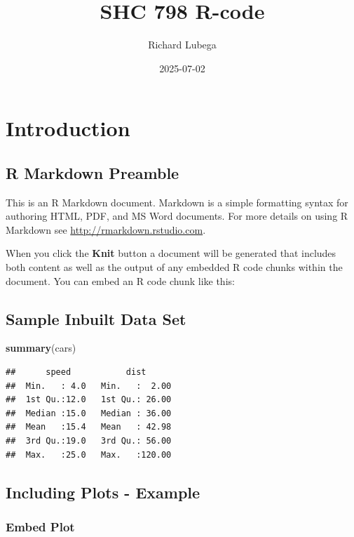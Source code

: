 \documentclass[
]{article}
\title{SHC 798 R-code}
\author{Richard Lubega}
\date{2025-07-02}
\newenvironment{Shaded}{\begin{snugshade}}{\end{snugshade}}
\newcommand{\FunctionTok}[1]{\textcolor[rgb]{0.13,0.29,0.53}{\textbf{#1}}}
\newcommand{\NormalTok}[1]{#1}
\begin{document}
\maketitle

\section{Introduction}\label{introduction}

\subsection{R Markdown Preamble}\label{r-markdown-preamble}

This is an R Markdown document. Markdown is a simple formatting syntax
for authoring HTML, PDF, and MS Word documents. For more details on
using R Markdown see \url{http://rmarkdown.rstudio.com}.

When you click the \textbf{Knit} button a document will be generated
that includes both content as well as the output of any embedded R code
chunks within the document. You can embed an R code chunk like this:

\subsection{Sample Inbuilt Data Set}\label{sample-inbuilt-data-set}

\begin{Shaded}
\begin{Highlighting}[]
\FunctionTok{summary}\NormalTok{(cars)}
\end{Highlighting}
\end{Shaded}

\begin{verbatim}
##      speed           dist       
##  Min.   : 4.0   Min.   :  2.00  
##  1st Qu.:12.0   1st Qu.: 26.00  
##  Median :15.0   Median : 36.00  
##  Mean   :15.4   Mean   : 42.98  
##  3rd Qu.:19.0   3rd Qu.: 56.00  
##  Max.   :25.0   Max.   :120.00
\end{verbatim}

\subsection{Including Plots - Example}\label{including-plots---example}

\subsubsection{Embed Plot}\label{embed-plot}
\end{document}
